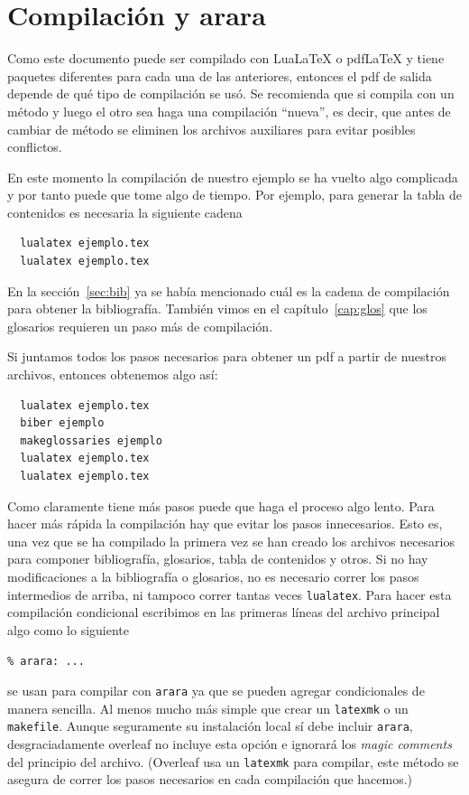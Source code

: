 
\chapter{Compilación y arara}
\label{cap:arara}
Como este documento puede ser compilado con Lua\LaTeX{} o pdf\LaTeX{} y tiene
paquetes diferentes para cada una de las anteriores, entonces el
pdf de salida depende de qué tipo de compilación se usó. Se recomienda que
si compila con un método y luego el otro sea haga una compilación
\enquote{nueva}, es decir, que antes de cambiar de
método se eliminen los archivos auxiliares para evitar posibles conflictos.

En este momento la compilación de nuestro ejemplo se ha vuelto algo complicada
y por tanto puede que tome algo de tiempo. Por ejemplo, para generar la tabla
de contenidos es necesaria la siguiente cadena
\begin{verbatim}
  lualatex ejemplo.tex
  lualatex ejemplo.tex
\end{verbatim}

En la sección~\ref{sec:bib} ya se había mencionado cuál es la cadena de
compilación para obtener la bibliografía. También vimos en el capítulo~\ref{cap:glos} que los glosarios requieren un paso más de compilación.

Si juntamos todos los pasos necesarios para obtener un pdf a partir de nuestros archivos, entonces obtenemos algo así:
\begin{verbatim}
  lualatex ejemplo.tex
  biber ejemplo
  makeglossaries ejemplo
  lualatex ejemplo.tex
  lualatex ejemplo.tex
\end{verbatim}
Como claramente tiene más pasos puede que haga el proceso algo lento.
Para hacer más rápida la compilación hay que evitar los pasos innecesarios.
Esto es, una vez que se ha compilado la primera vez se han creado los
archivos necesarios para componer bibliografía, glosarios, tabla de contenidos y
otros. Si no hay modificaciones a la bibliografía o glosarios, no es necesario
correr los pasos intermedios de arriba, ni tampoco correr tantas veces
\texttt{lualatex}. Para hacer esta compilación condicional escribimos
en las primeras líneas del archivo principal algo como lo siguiente
\begin{flushleft}
  \verb|% arara: ...|
\end{flushleft}
se usan para compilar con \texttt{arara} ya que se pueden agregar
condicionales de manera sencilla. Al menos mucho más simple que crear un
\texttt{latexmk} o un \texttt{makefile}. Aunque seguramente su instalación
local sí debe incluir \texttt{arara}, desgraciadamente overleaf no incluye
esta opción e ignorará los \textit{magic comments} del principio del archivo.
(Overleaf usa un \texttt{latexmk} para compilar, este método se asegura de
correr los pasos necesarios en cada compilación que hacemos.)

